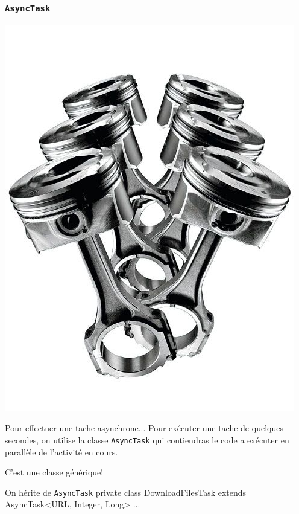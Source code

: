 \documentclass{beamer}
\begin{document}
\begin{frame}
\frametitle{\verb!AsyncTask!}
\begin{center}
\includegraphics[scale=0.07]{async.jpg}
\end{center}
\begin{block}{Pour effectuer une tache asynchrone...}
Pour exécuter une tache de quelques secondes, on utilise la classe \verb!AsyncTask! qui contiendras le code a exécuter en parallèle de l'activité en cours.
\end{block}
\pause
\begin{block}{}
C'est une classe générique!
\end{block}
\pause
\begin{exampleblock}{On hérite de \verb!AsyncTask!}
 private class DownloadFilesTask extends AsyncTask<URL, Integer, Long> { ... }
\end{exampleblock}
\end{frame}
\end{document}
